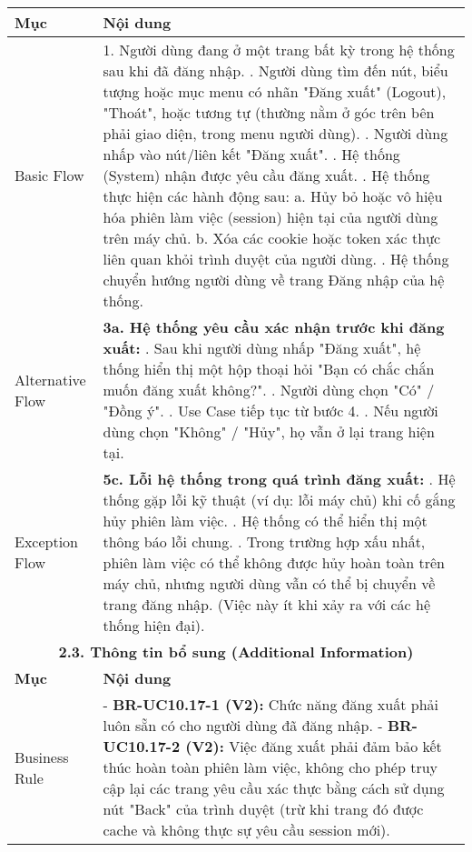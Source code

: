 \begin{longtable}{|m{4cm}|p{11cm}|}
\hline
\textbf{Mục} & \textbf{Nội dung} \\
\hline
Basic Flow & 1. Người dùng đang ở một trang bất kỳ trong hệ thống sau khi đã đăng nhập. \newline 2. Người dùng tìm đến nút, biểu tượng hoặc mục menu có nhãn "Đăng xuất" (Logout), "Thoát", hoặc tương tự (thường nằm ở góc trên bên phải giao diện, trong menu người dùng). \newline 3. Người dùng nhấp vào nút/liên kết "Đăng xuất". \newline 4. Hệ thống (System) nhận được yêu cầu đăng xuất. \newline 5. Hệ thống thực hiện các hành động sau: \newline    a. Hủy bỏ hoặc vô hiệu hóa phiên làm việc (session) hiện tại của người dùng trên máy chủ. \newline    b. Xóa các cookie hoặc token xác thực liên quan khỏi trình duyệt của người dùng. \newline 6. Hệ thống chuyển hướng người dùng về trang Đăng nhập của hệ thống. \\
\hline
Alternative Flow & \textbf{3a. Hệ thống yêu cầu xác nhận trước khi đăng xuất:} \newline    1. Sau khi người dùng nhấp "Đăng xuất", hệ thống hiển thị một hộp thoại hỏi "Bạn có chắc chắn muốn đăng xuất không?". \newline    2. Người dùng chọn "Có" / "Đồng ý". \newline    3. Use Case tiếp tục từ bước 4. \newline    4. Nếu người dùng chọn "Không" / "Hủy", họ vẫn ở lại trang hiện tại. \\
\hline
Exception Flow & \textbf{5c. Lỗi hệ thống trong quá trình đăng xuất:} \newline    1. Hệ thống gặp lỗi kỹ thuật (ví dụ: lỗi máy chủ) khi cố gắng hủy phiên làm việc. \newline    2. Hệ thống có thể hiển thị một thông báo lỗi chung. \newline    3. Trong trường hợp xấu nhất, phiên làm việc có thể không được hủy hoàn toàn trên máy chủ, nhưng người dùng vẫn có thể bị chuyển về trang đăng nhập. (Việc này ít khi xảy ra với các hệ thống hiện đại). \\
\hline
\multicolumn{2}{|c|}{\textbf{2.3. Thông tin bổ sung (Additional Information)}} \\
\hline
\textbf{Mục} & \textbf{Nội dung} \\
\hline
Business Rule & - \textbf{BR-UC10.17-1 (V2):} Chức năng đăng xuất phải luôn sẵn có cho người dùng đã đăng nhập. \newline - \textbf{BR-UC10.17-2 (V2):} Việc đăng xuất phải đảm bảo kết thúc hoàn toàn phiên làm việc, không cho phép truy cập lại các trang yêu cầu xác thực bằng cách sử dụng nút "Back" của trình duyệt (trừ khi trang đó được cache và không thực sự yêu cầu session mới). \\

\end{longtable}
